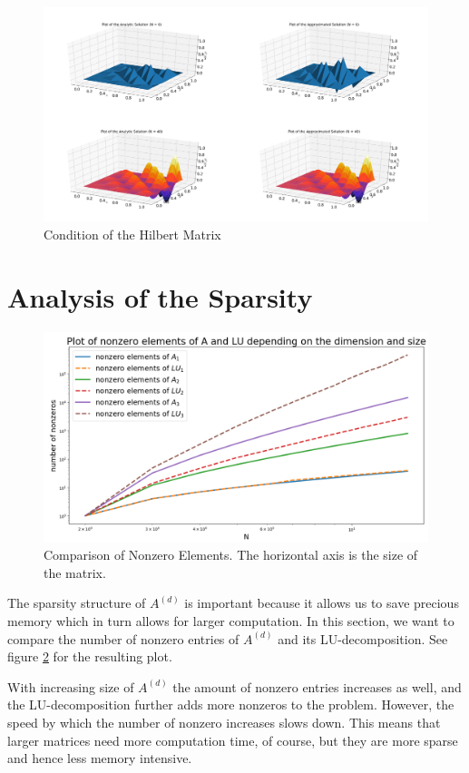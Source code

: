 \documentclass[refman]{article}
\theoremstyle{definition}
\begin{document}
\begin{figure}[h]
	\includegraphics[width=\linewidth]{graphics/plot.png}
	\caption{Condition of the Hilbert Matrix}
	\label{fig:plots}
\end{figure}
\bigskip

\section{Analysis of the Sparsity}

\begin{figure}[h]
	\includegraphics[width=\linewidth]{graphics/sparsity.png}
	\caption{Comparison of Nonzero Elements. The horizontal axis is the size of the matrix.}
	\label{fig:boat1}
\end{figure}

The sparsity structure of \(A^{(d)}\) is important because it allows us to save precious memory which in turn allows for larger computation. In this section, we want to compare the number of nonzero entries of \(A^{(d)}\) and its LU-decomposition. See figure \ref{fig:boat1} for the resulting plot.

With increasing size of \(A^{(d)}\) the amount of nonzero entries increases as well, and the LU-decomposition further adds more nonzeros to the problem. However, the speed by which the number of nonzero increases slows down. This means that larger matrices need more computation time, of course, but they are more sparse and hence less memory intensive.
\end{document}
